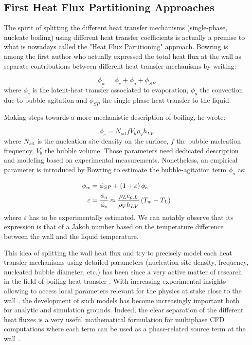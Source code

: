 \subsection{First Heat Flux Partitioning Approaches}

The spirit of splitting the different heat transfer mechanisms (single-phase, nucleate boiling) using different heat transfer coefficients is actually a premise to what is nowadays called the "Heat Flux Partitioning" approach. Bowring \cite{bowring} is among the first author who actually expressed the total heat flux at the wall as separate contributions between different heat transfer mechanisms by writing:

\begin{equation}
\phi_{w} = \phi_{e} + \phi_{a} + \phi_{SP}
\end{equation}
where $\phi_{e}$ is the latent-heat transfer associated to evaporation, $\phi_{a}$ the convection due to bubble agitation and $\phi_{SP}$ the single-phase heat transfer to the liquid. 

\npar

Making steps towards a more mechanistic description of boiling, he wrote:

\begin{equation}
\phi_{e} = N_{sit} f V_{b} \rho_{V} h_{LV}
\end{equation}
where $N_{sit}$ is the nucleation site density on the surface, $f$ the bubble nucleation frequency, $V_{b}$ the bubble volume. Those parameters need dedicated description and modeling based on experimental measurements. Nonetheless, an empirical parameter is introduced by Bowring to estimate the bubble-agitation term $\phi_{a}$ as:

\begin{align}
\phi_{w} &= \phi_{SP} + \left( 1+\varepsilon \right)\phi_{e}\\
\varepsilon &= \dfrac{\phi_{a}}{\phi_{e}} \approx \frac{\rho_{L}c_{p,L}}{\rho_{V}h_{LV}} \left( T_{w} - T_{L} \right)
\end{align}
where $\varepsilon$ has to be experimentally estimated. We can notably observe that its expression is that of a Jakob number based on the temperature difference between the wall and the liquid temperature.

\npar

This idea of splitting the wall heat flux and try to precisely model each heat transfer mechanisms using detailed parameters (nucleation site density, frequency, nucleated bubble diameter, etc.) has been since a very active matter of research in the field of boiling heat transfer \cite{del_valle_subcooled_1985, judd_hwang}. With increasing experimental insights allowing to access local parameters relevant for the physics at stake close to the wall \cite{maity_effect_2000, richenderfer_investigation_2018, yoo_experimental_2016, kossolapov_experimental_2021, sugrue_experimental_2014}, the development of such models has become increasingly important both for analytic and simulation grounds. Indeed, the clear separation of the different heat fluxes is a very useful mathematical formulation for multiphase CFD computations where each term can be used as a phase-related source term at the wall \cite{guelfi_neptune_2007, gilman_phd}. 

